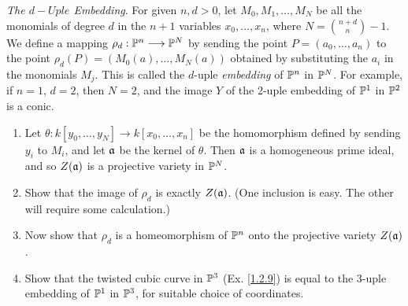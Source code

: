 \label{1.2.12}

\textit{The $d-Uple$ Embedding}. For given $n, d > 0$, let $M_0, M_1, \dots ,M_N$ be all the monomials of degree $d$ in the $n + 1$ variables $x_0 , \dots, x_n$, where $N = \binom{n + d}{n} - 1$. We
define a mapping $\rho_d: \P^n \longrightarrow \P^N$ by sending the point $P = (a_0, \dots ,a_n)$ to the point $\rho_d(P) = (M_0(a), \dots ,M_N(a))$ obtained by substituting the $a_i$ in the monomials $M_j$. This is called the $d$-uple \textit{embedding} of $\P^n$ in $\P^N$. For example, if $n = 1$, $d = 2$, then
$N = 2$, and the image $Y$ of the 2-uple embedding of $\P^1$ in $\P^2$ is a conic.

\begin{enumerate}[label = (\alph*)]
    \item Let $\theta: k[y_0 , \dots, y_N] \longrightarrow k[x_0 , \dots, x_n]$ be the homomorphism defined by sending $y_i$ to $M_i$, and let $\a$ be the kernel of $\theta$. Then $\a$ is a homogeneous prime ideal, and so $Z(\a)$ is a projective variety in $\P^N$.
    
    \item Show that the image of $\rho_d$ is exactly $Z(\a)$. (One inclusion is easy. The other will require some calculation.)
    
    \item Now show that $\rho_d$ is a homeomorphism of $\P^n$ onto the projective variety $Z(\a)$.
    
    \item Show that the twisted cubic curve in $\P^3$ (Ex. \ref{1.2.9}) is equal to the 3-uple embedding of $\P^1$ in $\P^3$, for suitable choice of coordinates.
\end{enumerate}

